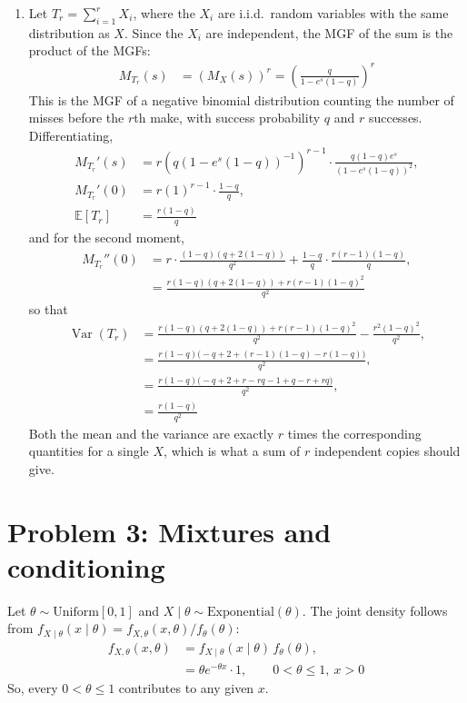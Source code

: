 \documentclass[11pt]{article}
\newcommand{\E}{\mathbb{E}}
\newcommand{\Var}{\operatorname{Var}}
\begin{document}
\begin{enumerate}[label=(\alph*)]
  \item Let $T_r = \sum_{i=1}^{r} X_i$, where the $X_i$ are i.i.d.\ random variables with the same
  distribution as $X$. Since the $X_i$ are independent, the MGF of the sum is the product of the MGFs:
  \begin{align}
    M_{T_r}(s) &= \left(M_X(s)\right)^r = \left(\frac{q}{1-e^s(1-q)}\right)^{r}
  \end{align}
  This is the MGF of a negative binomial distribution counting the number of misses before the $r$th
  make, with success probability $q$ and $r$ successes. Differentiating,
  \begin{align}
    M_{T_r}'(s) &= r\left(q(1-e^s(1-q))^{-1}\right)^{r-1}\cdot\frac{q(1-q)e^s}{(1-e^s(1-q))^2}, \\
    M_{T_r}'(0) &= r(1)^{r-1}\cdot\frac{1-q}{q}, \\
    \E[T_r] &= \frac{r(1-q)}{q}
  \end{align}
  and for the second moment,
  \begin{align}
    M_{T_r}''(0) &= r\cdot\frac{(1-q)(q+2(1-q))}{q^2}
      + \frac{1-q}{q}\cdot\frac{r(r-1)(1-q)}{q}, \\
    &= \frac{r(1-q)(q+2(1-q)) + r(r-1)(1-q)^2}{q^2}
  \end{align}
  so that
  \begin{align}
    \Var(T_r) &= \frac{r(1-q)(q+2(1-q)) + r(r-1)(1-q)^2}{q^2} - \frac{r^2(1-q)^2}{q^2}, \\
    &= \frac{r(1-q)\big(-q+2+(r-1)(1-q)-r(1-q)\big)}{q^2}, \\
    &= \frac{r(1-q)\big(-q+2+r-rq-1+q-r+rq\big)}{q^2}, \\
    &= \frac{r(1-q)}{q^2}
  \end{align}
  Both the mean and the variance are exactly $r$ times the corresponding quantities for a single $X$,
  which is what a sum of $r$ independent copies should give.
\end{enumerate}

\section*{Problem 3: Mixtures and conditioning}

Let $\theta \sim \text{Uniform}[0,1]$ and $X \mid \theta \sim \text{Exponential}(\theta)$.
The joint density follows from $f_{X\mid\theta}(x\mid\theta) = f_{X,\theta}(x,\theta)/f_\theta(\theta)$:
\begin{align}
  f_{X,\theta}(x,\theta) &= f_{X\mid\theta}(x\mid\theta)\,f_\theta(\theta), \\
  &= \theta e^{-\theta x}\cdot 1, \qquad 0 < \theta \le 1,\ x > 0
\end{align}
So, every $0 < \theta \le 1$ contributes to any given $x$. \\
\end{document}
